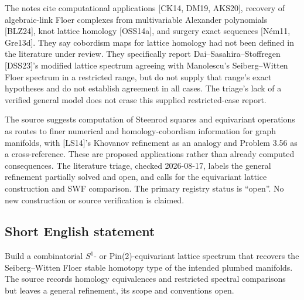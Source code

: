 \documentclass[11pt]{article}
\begin{document}
The notes cite computational applications [CK14, DM19, AKS20], recovery of algebraic-link Floer complexes from multivariable Alexander polynomials [BLZ24], knot lattice homology [OSS14a], and surgery exact sequences [Ném11, Gre13d]. They say cobordism maps for lattice homology had not been defined in the literature under review. They specifically report Dai--Sasahira--Stoffregen [DSS23]'s modified lattice spectrum agreeing with Manolescu's Seiberg--Witten Floer spectrum in a restricted range, but do not supply that range's exact hypotheses and do not establish agreement in all cases. The triage's lack of a verified general model does not erase this supplied restricted-case report.

The source suggests computation of Steenrod squares and equivariant operations as routes to finer numerical and homology-cobordism information for graph manifolds, with [LS14]'s Khovanov refinement as an analogy and Problem 3.56 as a cross-reference. These are proposed applications rather than already computed consequences. The literature triage, checked 2026-08-17, labels the general refinement partially solved and open, and calls for the equivariant lattice construction and SWF comparison. The primary registry status is ``open''. No new construction or source verification is claimed.
\subsection{Short English statement}
Build a combinatorial $S^1$- or Pin(2)-equivariant lattice spectrum that recovers the Seiberg--Witten Floer stable homotopy type of the intended plumbed manifolds. The source records homology equivalences and restricted spectral comparisons but leaves a general refinement, its scope and conventions open.
\end{document}
